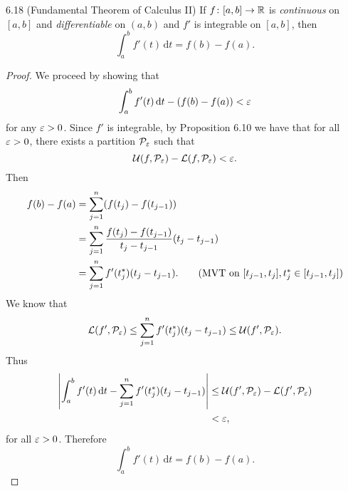 \documentclass[class=article, crop=false]{standalone}
\begin{document}
  \begin{theorem}{6.18 (Fundamental Theorem of Calculus II)}
    If $f\colon [a, b]\to \mathbb{R}$ is \emph{continuous} on $[a, b]$ and \emph{differentiable} on $(a, b)$ and $f'$ is integrable on $[a, b]$, then
    \[
      \int_{a}^{b}f'(t) \,\mathrm dt = f(b) - f(a).
    \]
    \begin{proof}
      We proceed by showing that
      \[
        \int_{a}^{b}f'(t) \,\mathrm dt - (f(b) - f(a)) < \varepsilon
      \]
      for any $\varepsilon > 0$. Since $f'$ is integrable, by Proposition 6.10 we have that for all $\varepsilon > 0$, there exists a partition $\mathcal{P}_{\varepsilon}$ such that
      \[
        \mathcal{U}(f, \mathcal{P}_{\varepsilon}) - \mathcal{L}(f, \mathcal{P}_{\varepsilon}) < \varepsilon.
      \]
      Then
      \begin{align*}
        f(b) - f(a) &= \sum_{j=1}^{n} (f(t_j) - f(t_{j - 1})) \\
                    &= \sum_{j=1}^{n} \frac{f(t_j) - f(t_{j - 1})}{t_j - t_{j - 1}}(t_j - t_{j - 1}) \\
                    &= \sum_{j=1}^{n} f'(t_j^*)(t_j - t_{j - 1}). \tag{MVT on $[t_{j - 1}, t_j], t_j^*\in [t_{j - 1}, t_j]$}
      \end{align*}
      We know that
      \[
        \mathcal{L}(f', \mathcal{P}_{\varepsilon}) \leq \sum_{j=1}^{n} f'(t_j^*)(t_j - t_{j - 1})\leq \mathcal{U}(f', \mathcal{P}_{\varepsilon}).
      \]
      Thus
      \begin{align*}
        \left\lvert \int_{a}^{b}f'(t) \,\mathrm dt - \sum_{j=1}^{n}f'(t_j^*)(t_j - t_{j - 1}) \right\rvert &\leq \mathcal{U}(f', \mathcal{P}_{\varepsilon}) - \mathcal{L}(f', \mathcal{P}_{\varepsilon}) \\
                                                                                            &< \varepsilon,
      \end{align*}
      for all $\varepsilon > 0$. Therefore
      \[
        \int_{a}^{b}f'(t) \,\mathrm dt = f(b) - f(a).
      \]
    \end{proof}
  \end{theorem}
\end{document}
